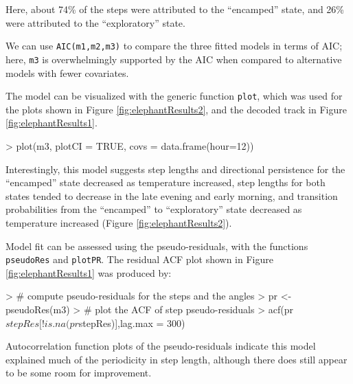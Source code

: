 \documentclass[12pt]{article}
\begin{document}
Here, about 74\% of the steps were attributed to the ``encamped'' state, and 26\% were attributed to the ``exploratory'' state. 

We can use \verb|AIC(m1,m2,m3)| to compare the three fitted models in terms of AIC; here, \verb|m3| is overwhelmingly supported by the AIC when compared to alternative models with fewer covariates.

The model can be visualized with the generic function \verb|plot|, which was used for the plots shown in Figure \ref{fig:elephantResults2}, and the decoded track in Figure \ref{fig:elephantResults1}.

\begin{Schunk}
\begin{Sinput}
> plot(m3, plotCI = TRUE, covs = data.frame(hour=12))
\end{Sinput}
\end{Schunk}

Interestingly, this model suggests step lengths and directional persistence for the ``encamped'' state decreased as temperature increased, step lengths for both states tended to decrease in the late evening and early morning, and transition probabilities from the ``encamped'' to ``exploratory'' state decreased as temperature increased (Figure \ref{fig:elephantResults2}). 

Model fit can be assessed using the pseudo-residuals, with the functions \verb|pseudoRes| and \verb|plotPR|. The residual ACF plot shown in Figure \ref{fig:elephantResults1} was produced by:
\begin{Schunk}
\begin{Sinput}
> # compute pseudo-residuals for the steps and the angles
> pr <- pseudoRes(m3)
> # plot the ACF of step pseudo-residuals
> acf(pr$stepRes[!is.na(pr$stepRes)],lag.max = 300)
\end{Sinput}
\end{Schunk}

Autocorrelation function plots of the pseudo-residuals indicate this model explained much of the periodicity in step length, although there does still appear to be some room for improvement.
\end{document}
